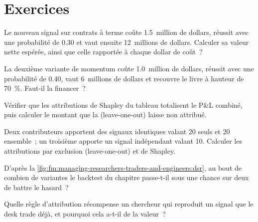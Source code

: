 \section{Exercices}

\begin{exercise}[$\star$]\label{exo:fm:managing-researchers-traders-and-engineers:1}
Le nouveau signal sur contrats à terme coûte 1.5~million de dollars, réussit avec une probabilité de 0.30 et vaut ensuite 12~millions de dollars. Calculer sa valeur nette espérée, ainsi que celle
rapportée à chaque dollar de coût~?
\end{exercise}

\begin{exercise}[$\star$]\label{exo:fm:managing-researchers-traders-and-engineers:2}
La deuxième variante de momentum coûte 1.0~million de dollars, réussit avec une probabilité de 0.40, vaut 6~millions de dollars et recouvre le livre à hauteur de 70~\%. Faut-il
la financer~?
\end{exercise}

\begin{exercise}[$\star$]\label{exo:fm:managing-researchers-traders-and-engineers:3}
Vérifier que les attributions de Shapley du tableau totalisent le P\&L combiné, puis calculer le montant que la  (leave-one-out) laisse non attribué.
\end{exercise}

\begin{exercise}[$\star\star$]\label{exo:fm:managing-researchers-traders-and-engineers:4}
Deux contributeurs apportent des signaux identiques valant 20 seuls et 20 ensemble~; un troisième apporte un signal indépendant valant 10. Calculer les attributions par
exclusion (leave-one-out) et de Shapley.
\end{exercise}

\begin{exercise}[$\star\star$]\label{exo:fm:managing-researchers-traders-and-engineers:5}
D'après la \cref{fig:fm:managing-researchers-traders-and-engineers:dsr}, au bout de combien de variantes le backtest du chapitre passe-t-il sous une chance sur deux
de battre le hasard~?
\end{exercise}

\begin{exercise}[$\star\star$]\label{exo:fm:managing-researchers-traders-and-engineers:6}
Quelle règle d'attribution récompense un chercheur qui reproduit un signal que le desk trade déjà, et pourquoi cela a-t-il de la valeur~?
\end{exercise}

